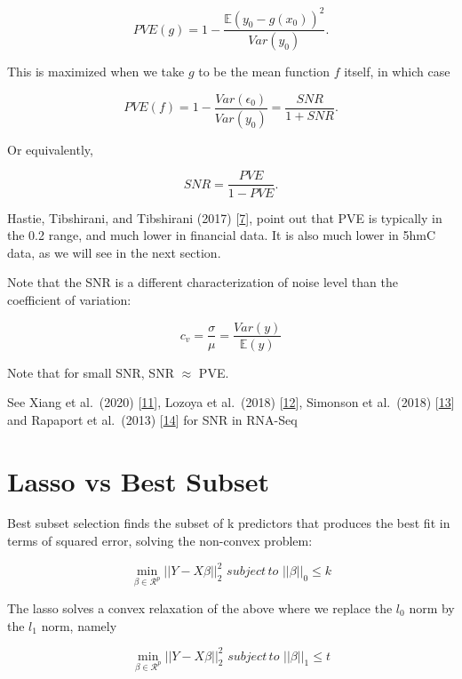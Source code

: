 \documentclass[
]{book}
\begin{document}
\[PVE(g)=1 - \frac{\mathbb{E}(y_0-g(x_0))^2}{Var(y_0)}.\]

This is maximized when we take \(g\) to be the mean function \(f\) itself,
in which case

\[PVE(f) = 1 - \frac{Var(\epsilon_0)}{Var(y_0)} = \frac{SNR}{1+SNR}.\]

Or equivalently,

\[SNR = \frac{PVE}{1-PVE}.\]

Hastie, Tibshirani, and Tibshirani (2017) {[}\protect\hyperlink{ref-Hastie:2017aa}{7}{]}, point out that
PVE is typically in the 0.2 range, and much lower in financial data. It
is also much lower in 5hmC data, as we will see in the next section.

Note that the SNR is a different characterization of noise level than the
coefficient of variation:

\[c_v = \frac{\sigma}{\mu}=\frac{Var(y)}{\mathbb{E}(y)}\]

Note that for small SNR, SNR \(\approx\) PVE.

See Xiang et al.~(2020) {[}\protect\hyperlink{ref-Xiang:2020aa}{11}{]}, Lozoya et al.~(2018) {[}\protect\hyperlink{ref-Lozoya:2018aa}{12}{]},
Simonson et al.~(2018) {[}\protect\hyperlink{ref-Simonsen:2018aa}{13}{]} and
Rapaport et al.~(2013) {[}\protect\hyperlink{ref-Rapaport:2013aa}{14}{]} for SNR in RNA-Seq

\hypertarget{lasso-vs-best-sub}{%
\section{Lasso vs Best Subset}\label{lasso-vs-best-sub}}

Best subset selection finds the subset of k predictors that
produces the best fit in terms of squared error, solving the non-convex problem:

\begin{equation}
 \min_{\beta \in \mathcal{R}^p} ||Y - X\beta||^2_2 \, \, subject \, to \, \, ||\beta||_0 \leq k
 \label{eq:bestSub}
\end{equation}

The lasso solves a convex relaxation of the above where we replace the
\(l_0\) norm by the \(l_1\) norm, namely

\begin{equation}

 \min_{\beta \in \mathcal{R}^p} ||Y - X\beta||^2_2 \, \, subject \, to \, \, ||\beta||_1 \leq t

 \label{eq:lasso}
\end{equation}
\end{document}

